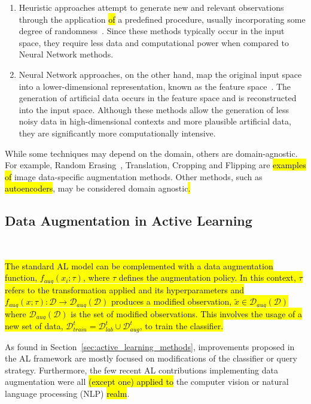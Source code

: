 \documentclass[preprint, 12pt]{elsarticle}
\begin{document}
\begin{enumerate}
    \item Heuristic approaches attempt to generate new and relevant
        observations through the application \hl{of} a predefined procedure,
        usually incorporating some degree of randomness~\cite{Kashefi2020}.
        Since these methods typically occur in the input space, they require
        less data and computational power when compared to Neural Network
        methods. 
    \item Neural Network approaches, on the other hand, map the original input
        space into a lower-dimensional representation, known as the feature
        space~\cite{DeVries2017}. The generation of artificial data occurs in
        the feature space and is reconstructed into the input space. Although
        these methods allow the generation of less noisy data in
        high-dimensional contexts and more plausible artificial data, they are
        significantly more computationally intensive. 
\end{enumerate}

While some techniques may depend on the domain, others are domain-agnostic.
For example, Random Erasing~\cite{Zhong2020}, Translation, Cropping and
Flipping are \hl{examples of} image data-specific augmentation methods. Other
methods, such as \hl{autoencoders}, may be considered domain agnostic\hl{.}

\subsection{Data Augmentation in Active Learning
}~\label{sec:data_augmentation_in_al}

\hl{The standard AL model can be complemented with a data augmentation
function, $f_{aug}(x_i;\tau)$, where $\tau$ defines the augmentation policy.
In this context, $\tau$ refers to the transformation applied and its
hyperparameters and $f_{aug}(x;\tau): \mathcal{D} \rightarrow
\mathcal{D}_{aug}(\mathcal{D})$ produces a modified observation,
$\tilde{x} \in \mathcal{D}_{aug}(\mathcal{D})$ where
$\mathcal{D}_{aug}(\mathcal{D})$ is the set of modified observations. This
involves the usage of a new set of data, $\mathcal{D}_{train}^t =
\mathcal{D}_{lab}^t \cup \mathcal{D}_{aug}^t$, to train the classifier.}


As found in Section~\ref{sec:active_learning_methods}, improvements proposed
in the AL framework are mostly focused on modifications of the classifier or
query strategy. Furthermore, the few recent AL contributions implementing data
augmentation were all \hl{(except one) applied to} the computer vision or
natural language processing (NLP) \hl{realm}. 
\end{document}
